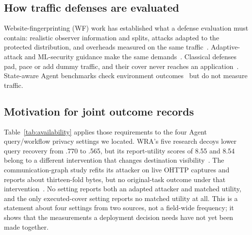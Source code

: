 \subsection{How traffic defenses are evaluated}
Website-fingerprinting (WF) work has established what a defense evaluation must contain: realistic observer information and splits, attacks adapted to the protected distribution, and overheads measured on the same traffic~\cite{juarez2014critical,mathews2023critical,dyer2012peekaboo}. Adaptive-attack and ML-security guidance make the same demands~\cite{tramer2020adaptive,arp2022dos}. Classical defenses pad, pace or add dummy traffic, and their cover never reaches an application~\cite{wang2017walkietalkie,gong2020front,juarez2016wtfpad,apthorpe2019stp}. State-aware Agent benchmarks check environment outcomes~\cite{yao2024taubench,debenedetti2024agentdojo} but do not measure traffic.

\subsection{Motivation for joint outcome records}\label{sec:gap}
Table~\ref{tab:availability} applies those requirements to the four Agent query/workflow privacy settings we located. WRA's five research decoys lower query recovery from .770 to .565, but its report-utility scores of 8.55 and 8.54 belong to a different intervention that changes destination visibility~\cite{jeong2026wra}. The communication-graph study refits its attacker on live OHTTP captures and reports about thirteen-fold bytes, but no original-task outcome under that intervention~\cite{dangol2026workflow}. No setting reports both an adapted attacker and matched utility, and the only executed-cover setting reports no matched utility at all. This is a statement about four settings from two sources, not a field-wide frequency; it shows that the measurements a deployment decision needs have not yet been made together.


